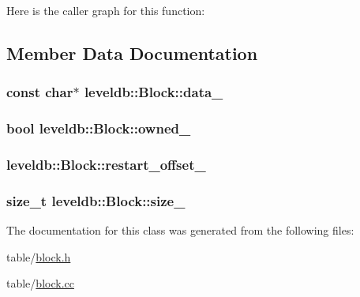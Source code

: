 Here is the caller graph for this function\-:




\subsection{Member Data Documentation}
\hypertarget{classleveldb_1_1_block_aedfaf47f457b1057b7d5e3146393d94c}{
\subsubsection[{data\-\_\-}]{\setlength{\rightskip}{0pt plus 5cm}const char$\ast$ leveldb\-::\-Block\-::data\-\_\-\hspace{0.3cm}{\ttfamily [private]}}}\label{classleveldb_1_1_block_aedfaf47f457b1057b7d5e3146393d94c}
\hypertarget{classleveldb_1_1_block_a25d5a54eb3768137e091e65734246228}{
\subsubsection[{owned\-\_\-}]{\setlength{\rightskip}{0pt plus 5cm}bool leveldb\-::\-Block\-::owned\-\_\-\hspace{0.3cm}{\ttfamily [private]}}}\label{classleveldb_1_1_block_a25d5a54eb3768137e091e65734246228}
\hypertarget{classleveldb_1_1_block_aff5d8e7ec05b873104096fd2dce60a59}{
\subsubsection[{restart\-\_\-offset\-\_\-}]{ leveldb\-::\-Block\-::restart\-\_\-offset\-\_\-\hspace{0.3cm}{\ttfamily [private]}}}\label{classleveldb_1_1_block_aff5d8e7ec05b873104096fd2dce60a59}
\hypertarget{classleveldb_1_1_block_a7259478dd4f8989fe791a2b7e9b322fa}{
\subsubsection[{size\-\_\-}]{\setlength{\rightskip}{0pt plus 5cm}size\-\_\-t leveldb\-::\-Block\-::size\-\_\-\hspace{0.3cm}{\ttfamily [private]}}}\label{classleveldb_1_1_block_a7259478dd4f8989fe791a2b7e9b322fa}


The documentation for this class was generated from the following files\-:\begin{DoxyCompactItemize}
\item 
table/\hyperlink{block_8h}{block.\-h}\item 
table/\hyperlink{block_8cc}{block.\-cc}\end{DoxyCompactItemize}
